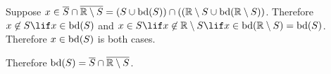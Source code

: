             Suppose 
            $x \in \overline{S} \cap \overline{\mathbb{R} \setminus S}
                = (S \cup \textrm{bd}(S)) \cap ((\mathbb{R} \setminus S \cup \textrm{bd}(\mathbb{R} \setminus S))$.
            Therefore $x \not\in S \lif x \in \bd(S)$
            and $x \in S \lif x \not\in \R \setminus S \lif x \in \bd(\R \setminus S) = \bd(S)$.
            Therefore $x \in \textrm{bd}(S)$ is both cases.

        Therefore
        $\textrm{bd}(S) = \overline{S} \cap \overline{\mathbb{R} \setminus S}$.